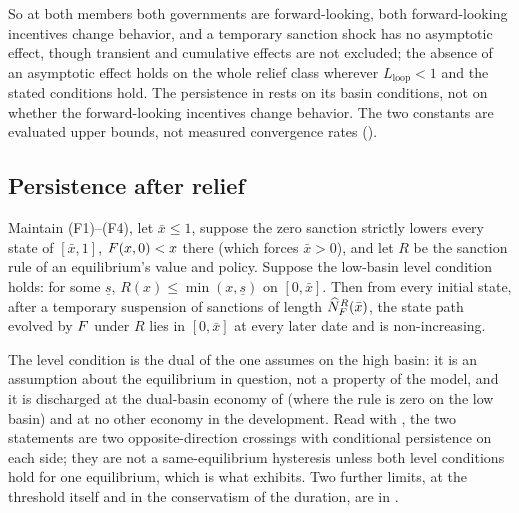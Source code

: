 So at both members both governments are forward-looking, both forward-looking incentives change
behavior, and a temporary sanction shock has no asymptotic effect, though
transient and cumulative effects are not excluded; the absence of an
asymptotic effect holds on the whole relief class wherever
$L_{\mathrm{loop}}<1$ and the stated conditions hold. The persistence in
 rests on its basin conditions, not on whether the forward-looking incentives
change behavior. The two constants are evaluated upper bounds, not measured
convergence rates ().

\subsection{Persistence after relief}

\begin{proposition}
\label{prop:post-relief-persistence}
Maintain \textup{(F1)--(F4)}, let $\bar x\le1$, suppose the zero sanction
strictly lowers every state of $[\bar x,1]$, $F(x,0)<x$ there (which forces
$\bar x>0$), and let $R$ be the sanction rule of an equilibrium's
value and policy. Suppose the low-basin
level condition holds: for some $\underline s$, $R(x)\le\min(x,\underline s)$
on $[0,\bar x]$. Then from every initial state, after a temporary suspension
of sanctions of length $\widehat N^{R}_{F}(\bar x)$, the state path evolved by
$F$ under $R$ lies in $[0,\bar x]$ at every later date and is
non-increasing.
\end{proposition}

The level condition is the dual of the one  assumes on the
high basin: it is an assumption about the equilibrium in question, not a
property of the model, and it is discharged at the dual-basin economy of
 (where the rule is zero on the low
basin) and at no other economy in the development. Read with
, the two statements are two opposite-direction crossings
with conditional persistence on each side; they are not a same-equilibrium
hysteresis unless both level conditions hold for one equilibrium, which is
what  exhibits. Two further limits, at the
threshold itself and in the conservatism of the duration, are in
.

